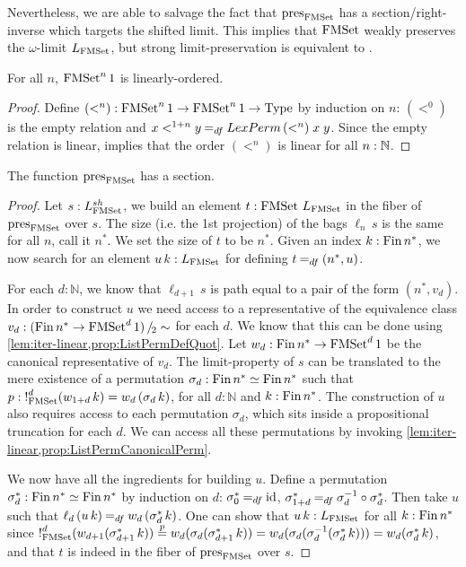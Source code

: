 \documentclass[final,a4paper,USenglish,cleveref]{lipics-v2021}
\begin{document}
Nevertheless, we are able to salvage the fact that $\pres{\FMSet}$ has a section/right-inverse which targets the shifted limit. This implies that $\FMSet$ weakly preserves the $\omega$-limit $\Lim{\FMSet}$, but strong limit-preservation is equivalent to \LLPO{}.
\begin{lemma}\label{lem:iter-linear}
For all $n$, $\FMSet^n 1$ is linearly-ordered.
\end{lemma}
\begin{proof}
Define $(<^n) : \FMSet^n 1 \to \FMSet^n 1 \to \Type$ by induction on $n$: $(<^0)$ is the empty relation and $x <^{1 + n} y \DefEq \LexPerm\,(<^n)\;x\;y$. Since the empty relation is linear,  implies that the order $(<^n)$ is linear for all $n : \mathbb{N}$.
\end{proof}

\begin{theorem}\label{thm:PresFMSetSection}
 The function $\pres{\FMSet}$ has a section.
\end{theorem}
\begin{proof}
  Let $s : \LimSh{\FMSet}$, we build an element $t : \FMSet \,\Lim{\FMSet}$ in the fiber of $\pres{\FMSet}$ over $s$. The size (i.e. the 1st projection) of the bags $\ell_n\,s$ is the same for all $n$, call it $n^*$. We set the size of $t$ to be $n^*$. Given an index $k : \Fin n^*$, we now search for an element $u\,k : \Lim{\FMSet}$ for defining $t \DefEq (n^*,u)$.

  For each $d : ℕ$, we know that $\ell_{d + 1}\,s$ is path equal to a pair of the form $(n^*,v_d)$. In order to construct $u$ we need access to a representative of the equivalence class $v_d : \SetQuot[(\Fin n^* \to \FMSet^d 1)][\sim]$ for each $d$. We know that this can be done using \cref{lem:iter-linear,prop:ListPermDefQuot}. Let $w_d : \Fin n^* \to \FMSet^d 1$ be the canonical representative of $v_d$.
  The limit-property of $s$ can be translated to the mere existence of a permutation $\sigma_d : \Fin n^* \simeq \Fin n^*$
  such that $p : \Bang_{\FMSet}^d(w_{1 + d}\, k) = w_d \,(\sigma_d\,k)$, for all $d: ℕ$ and $k : \Fin n^*$. The construction of $u$ also requires access to each permutation $\sigma_d$, which sits inside a propositional truncation for each $d$. We can access all these permutations by invoking \cref{lem:iter-linear,prop:ListPermCanonicalPerm}.

  We now have all the ingredients for building $u$. Define a permutation $\sigma^*_d : \Fin n^* \simeq \Fin n^*$ by induction on $d$: $\sigma^*_0 \DefEq \Op{id}$, $\sigma^*_{1+d} \DefEq \sigma_d^{-1} \circ \sigma^*_d$. Then take $u$ such that $\ell_d \,(u\,k) \DefEq w_d\,(\sigma^*_d \,k)$. One can show that $u\,k : \Lim{\FMSet}$ for all $k : \Fin n^*$ since
  $\Bang_{\FMSet}^d (w_{d+1}(\sigma^*_{d+1}\, k)) \stackrel{p}{=} w_d (\sigma_d (\sigma^*_{d+1}\, k)) = w_d (\sigma_d (\sigma_d^{-1} (\sigma^*_d\, k))) = w_d (\sigma^*_d\, k)$,
  and that $t$ is indeed in the fiber of $\pres{\FMSet}$ over $s$.
\end{proof}
\end{document}
